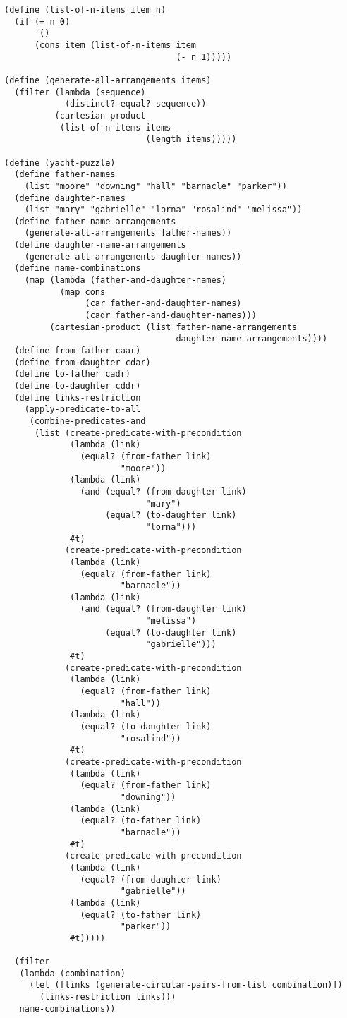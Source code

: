 \documentclass[../main.tex]{subfiles}
\begin{document}
\begin{lstlisting}
(define (list-of-n-items item n)
  (if (= n 0)
      '()
      (cons item (list-of-n-items item
                                  (- n 1)))))

(define (generate-all-arrangements items)
  (filter (lambda (sequence)
            (distinct? equal? sequence))
          (cartesian-product
           (list-of-n-items items
                            (length items)))))

(define (yacht-puzzle)
  (define father-names
    (list "moore" "downing" "hall" "barnacle" "parker"))
  (define daughter-names
    (list "mary" "gabrielle" "lorna" "rosalind" "melissa"))
  (define father-name-arrangements
    (generate-all-arrangements father-names))
  (define daughter-name-arrangements
    (generate-all-arrangements daughter-names))
  (define name-combinations
    (map (lambda (father-and-daughter-names)
           (map cons
                (car father-and-daughter-names)
                (cadr father-and-daughter-names)))
         (cartesian-product (list father-name-arrangements
                                  daughter-name-arrangements))))
  (define from-father caar)
  (define from-daughter cdar)
  (define to-father cadr)
  (define to-daughter cddr)
  (define links-restriction
    (apply-predicate-to-all
     (combine-predicates-and
      (list (create-predicate-with-precondition
             (lambda (link)
               (equal? (from-father link)
                       "moore"))
             (lambda (link)
               (and (equal? (from-daughter link)
                            "mary")
                    (equal? (to-daughter link)
                            "lorna")))
             #t)
            (create-predicate-with-precondition
             (lambda (link)
               (equal? (from-father link)
                       "barnacle"))
             (lambda (link)
               (and (equal? (from-daughter link)
                            "melissa")
                    (equal? (to-daughter link)
                            "gabrielle")))
             #t)
            (create-predicate-with-precondition
             (lambda (link)
               (equal? (from-father link)
                       "hall"))
             (lambda (link)
               (equal? (to-daughter link)
                       "rosalind"))
             #t)
            (create-predicate-with-precondition
             (lambda (link)
               (equal? (from-father link)
                       "downing"))
             (lambda (link)
               (equal? (to-father link)
                       "barnacle"))
             #t)
            (create-predicate-with-precondition
             (lambda (link)
               (equal? (from-daughter link)
                       "gabrielle"))
             (lambda (link)
               (equal? (to-father link)
                       "parker"))
             #t)))))
                            
  (filter
   (lambda (combination)
     (let ([links (generate-circular-pairs-from-list combination)])
       (links-restriction links)))
   name-combinations))
\end{lstlisting}
\end{document}
